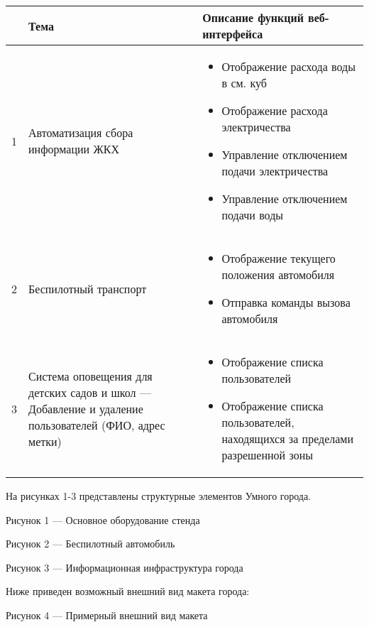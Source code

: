 \begin{longtable}{|c|p{6cm}|p{8cm}|}
    \hline
    & Тема & Описание функций веб-интерфейса \\
    \hline
    1 & Автоматизация сбора информации ЖКХ & 
    \begin{itemize}
        \item Отображение расхода воды в см. куб
        \item Отображение расхода электричества
        \item Управление отключением подачи электричества
        \item Управление отключением подачи воды                
    \end{itemize} \\
    \hline
    2 & Беспилотный транспорт &
    \begin{itemize}
        \item Отображение текущего положения автомобиля
        \item Отправка команды вызова автомобиля    
    \end{itemize} \\
    \hline
    3 & Система оповещения для детских садов и школ	— Добавление и удаление пользователей (ФИО, адрес метки) &
    \begin{itemize}
        \item Отображение списка пользователей
        \item Отображение списка пользователей, находящихся за пределами разрешенной зоны                
    \end{itemize}\\
    \hline
\end{longtable}

На рисунках 1-3 представлены структурные элементов Умного города. 


\centerline{Рисунок 1 — Основное оборудование стенда}


\centerline{Рисунок 2 — Беспилотный автомобиль}


\centerline{Рисунок 3 — Информационная инфраструктура города}

Ниже приведен возможный внешний вид макета города:


\centerline{Рисунок 4 — Примерный внешний вид макета}

